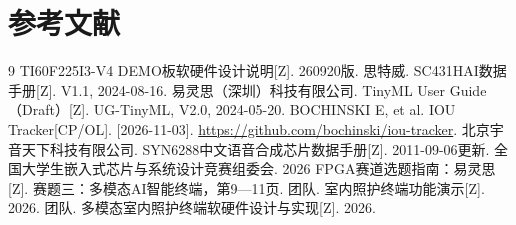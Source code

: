 \documentclass[UTF8,a4paper,zihao=-4,fontset=none,scheme=plain]{ctexart}
\begin{document}
\clearpage
\section{参考文献}
\begingroup
\renewcommand{\section}[2]{}
\small
\begin{thebibliography}{9}
\setlength{\itemsep}{0pt}
 TI60F225I3-V4 DEMO板软硬件设计说明[Z]. 260920版.
 思特威. SC431HAI数据手册[Z]. V1.1, 2024-08-16.
 易灵思（深圳）科技有限公司. TinyML User Guide（Draft）[Z]. UG-TinyML, V2.0, 2024-05-20.
 BOCHINSKI E, et al. IOU Tracker[CP/OL]. [2026-11-03]. \url{https://github.com/bochinski/iou-tracker}.
 北京宇音天下科技有限公司. SYN6288中文语音合成芯片数据手册[Z]. 2011-09-06更新.
 全国大学生嵌入式芯片与系统设计竞赛组委会. 2026 FPGA赛道选题指南：易灵思[Z]. 赛题三：多模态AI智能终端，第9—11页.
 团队. 室内照护终端功能演示[Z]. 2026.
 团队. 多模态室内照护终端软硬件设计与实现[Z]. 2026.
\end{thebibliography}
\endgroup
\end{document}
